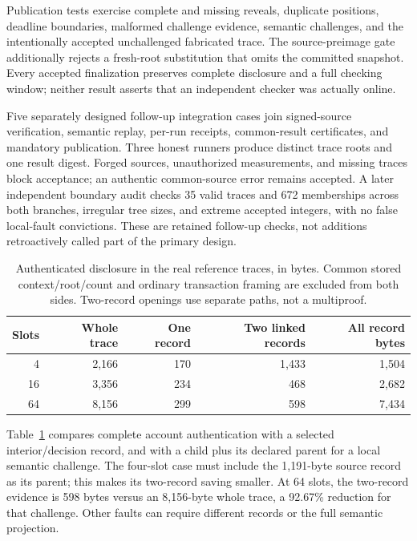 Publication tests exercise complete and missing reveals, duplicate positions, deadline boundaries, malformed challenge evidence, semantic challenges, and the intentionally accepted unchallenged fabricated trace. The source-preimage gate additionally rejects a fresh-root substitution that omits the committed snapshot. Every accepted finalization preserves complete disclosure and a full checking window; neither result asserts that an independent checker was actually online.

Five separately designed follow-up integration cases join signed-source verification, semantic replay, per-run receipts, common-result certificates, and mandatory publication. Three honest runners produce distinct trace roots and one result digest. Forged sources, unauthorized measurements, and missing traces block acceptance; an authentic common-source error remains accepted. A later independent boundary audit checks 35 valid traces and 672 memberships across both branches, irregular tree sizes, and extreme accepted integers, with no false local-fault convictions. These are retained follow-up checks, not additions retroactively called part of the primary design.

\begin{table}[t]
\centering\small
\caption{Authenticated disclosure in the real reference traces, in bytes. Common stored context/root/count and ordinary transaction framing are excluded from both sides. Two-record openings use separate paths, not a multiproof.}
\label{tab:bytes}
\begin{tabular}{rrrrr}
\toprule
Slots & Whole trace & One record & Two linked records & All record bytes\\
\midrule
4 & 2,166 & 170 & 1,433 & 1,504\\
16 & 3,356 & 234 & 468 & 2,682\\
64 & 8,156 & 299 & 598 & 7,434\\
\bottomrule
\end{tabular}
\end{table}

Table~\ref{tab:bytes} compares complete account authentication with a selected interior/decision record, and with a child plus its declared parent for a local semantic challenge. The four-slot case must include the 1,191-byte source record as its parent; this makes its two-record saving smaller. At 64 slots, the two-record evidence is 598 bytes versus an 8,156-byte whole trace, a 92.67\% reduction for that challenge. Other faults can require different records or the full semantic projection.

